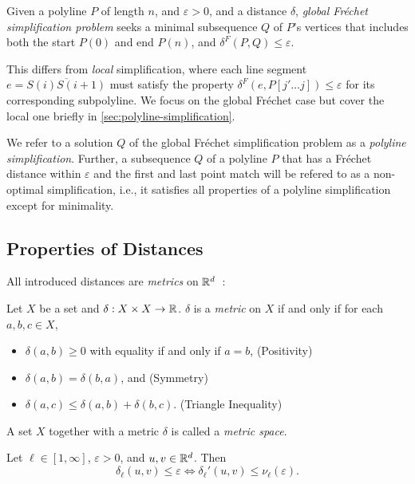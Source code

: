 \begin{definition}
	Given a polyline \(P\) of length \(n\), and \(\varepsilon > 0\), and a distance \(\delta\), \emph{global Fréchet simplification problem} seeks a minimal subsequence \(Q\) of \(P\)'s vertices that includes both the start \(P(0)\) and end \(P(n)\), and \(\delta^F(P, Q) \leq \varepsilon\).
\end{definition}

This differs from \emph{local} simplification, where each line segment \(e = \overline{S(i)S(i+1)}\) must satisfy the property \(\delta^F(e, P[j' \dots j]) \leq \varepsilon\) for its corresponding subpolyline. We focus on the global Fréchet case but cover the local one briefly in \cref{sec:polyline-simplification}.

We refer to a solution \(Q\) of the global Fréchet simplification problem as a \emph{polyline simplification}. Further, a subsequence \(Q\) of a polyline \(P\) that has a Fréchet distance within \(\varepsilon\) and the first and last point match will be refered to as a non-optimal simplification, i.e., it satisfies all properties of a polyline simplification except for minimality.

\subsection{Properties of Distances}
All introduced distances are \emph{metrics} on \(\mathbb{R}^d\)~\cite{metric_spaces}:

\begin{definition}\label{def:metric}
  Let \(X\) be a set and \(\delta:X\times X \to \mathbb{R}\). \(\delta\) is a \emph{metric} on \(X\) if and only if for each \(a, b, c \in X\), 
  \begin{itemize}
    \item \(\delta(a, b) \geq 0\) with equality if and only if \(a = b\), \hfill (Positivity)
    \item \(\delta(a, b) = \delta(b, a)\), and \hfill (Symmetry)
    \item \(\delta(a, c) \leq \delta(a, b) + \delta(b, c)\). \hfill (Triangle Inequality)
  \end{itemize}

  A set \(X\) together with a metric \(\delta\) is called a \emph{metric space}.
\end{definition}

\begin{observation}\label{obs:unnormalize}
  Let \(\ell \in [1, \infty]\), \(\varepsilon > 0\), and \(u, v \in \mathbb{R}^d\). Then 
    \[\delta_\ell(u, v) \leq \varepsilon \iff \delta_\ell'(u, v) \leq \nu_\ell(\varepsilon).\]
\end{observation}

